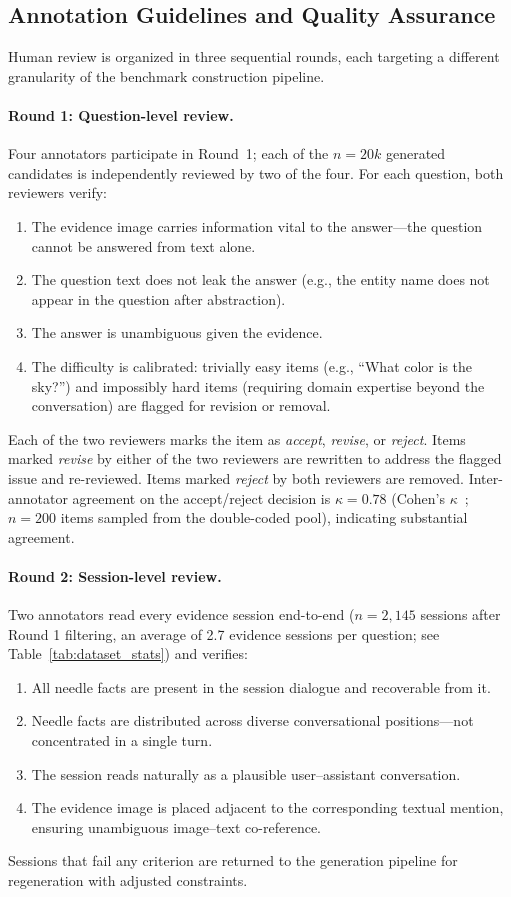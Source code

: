 \documentclass{llmxive}
\begin{document}
\subsection{Annotation Guidelines and Quality Assurance}
\label{app:annotation}

Human review is organized in three sequential rounds, each targeting a different granularity of the benchmark construction pipeline.

\paragraph{Round 1: Question-level review.}
Four annotators participate in Round~1; each of the $n = 20k$ generated candidates is independently reviewed by two of the four. For each question, both reviewers verify:
\begin{enumerate}
    \item The evidence image carries information vital to the answer---the question cannot be answered from text alone.
    \item The question text does not leak the answer (e.g., the entity name does not appear in the question after abstraction).
    \item The answer is unambiguous given the evidence.
    \item The difficulty is calibrated: trivially easy items (e.g., ``What color is the sky?'') and impossibly hard items (requiring domain expertise beyond the conversation) are flagged for revision or removal.
\end{enumerate}
Each of the two reviewers marks the item as \emph{accept}, \emph{revise}, or \emph{reject}. Items marked \emph{revise} by either of the two reviewers are rewritten to address the flagged issue and re-reviewed. Items marked \emph{reject} by both reviewers are removed. Inter-annotator agreement on the accept/reject decision is $\kappa = 0.78$ (Cohen's $\kappa$~\cite{cohen1960coefficient}; $n = 200$ items sampled from the double-coded pool), indicating substantial agreement.

\paragraph{Round 2: Session-level review.}
Two annotators read every evidence session end-to-end ($n = 2{,}145$ sessions after Round 1 filtering, an average of 2.7 evidence sessions per question; see Table~\ref{tab:dataset_stats}) and verifies:
\begin{enumerate}
    \item All needle facts are present in the session dialogue and recoverable from it.
    \item Needle facts are distributed across diverse conversational positions---not concentrated in a single turn.
    \item The session reads naturally as a plausible user--assistant conversation.
    \item The evidence image is placed adjacent to the corresponding textual mention, ensuring unambiguous image--text co-reference.
\end{enumerate}
Sessions that fail any criterion are returned to the generation pipeline for regeneration with adjusted constraints.
\end{document}

